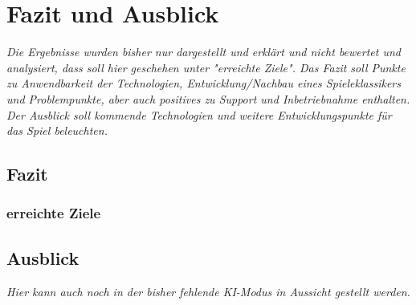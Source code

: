 \chapter{Fazit und Ausblick}
\label{cha:fazit}

\emph{Die Ergebnisse wurden bisher nur dargestellt und erklärt und nicht bewertet und analysiert, dass soll hier geschehen unter "erreichte Ziele". Das Fazit soll Punkte zu Anwendbarkeit der Technologien, Entwicklung/Nachbau eines Spieleklassikers und Problempunkte, aber auch positives zu Support und Inbetriebnahme enthalten. Der Ausblick soll kommende Technologien und weitere Entwicklungspunkte für das Spiel beleuchten.}

\section{Fazit}
\label{sec:Schlussfolgerung}

\subsection{erreichte Ziele}
\label{subsec:erreichte_ziele}

\section{Ausblick}
\label{sec:Ausblick}

\emph{Hier kann auch noch in der bisher fehlende KI-Modus in Aussicht gestellt werden.}
